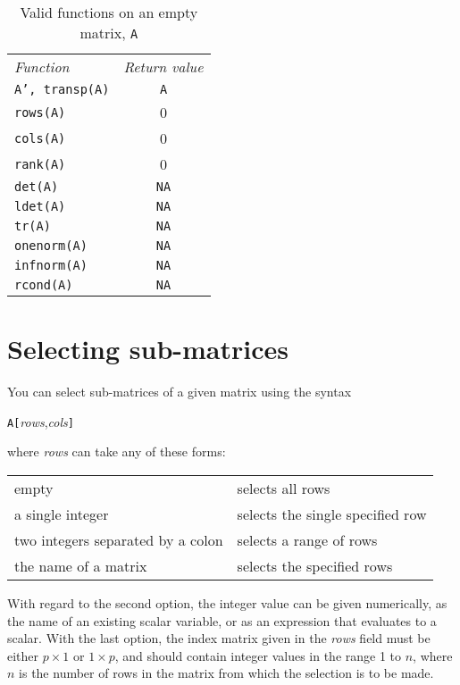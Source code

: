 \begin{table}[htbp]
\centering
\begin{tabular}{lc}
\textit{Function} & \textit{Return value} \\ [4pt]
  \texttt{A', transp(A)} & \texttt{A} \\
  \texttt{rows(A)} & 0 \\
  \texttt{cols(A)} & 0 \\
  \texttt{rank(A)} & 0 \\
  \texttt{det(A)} & \texttt{NA} \\
  \texttt{ldet(A)} & \texttt{NA} \\
  \texttt{tr(A)} & \texttt{NA} \\
  \texttt{onenorm(A)} & \texttt{NA} \\
  \texttt{infnorm(A)} & \texttt{NA} \\
  \texttt{rcond(A)} & \texttt{NA} \\
\end{tabular}
\caption{Valid functions on an empty matrix, \texttt{A}}
\label{tab:empty-matrix-funcs}
\end{table}


\section{Selecting sub-matrices}
\label{sec:matrix-sub}

You can select sub-matrices of a given matrix using the syntax

\texttt{A[}\textsl{rows},\textsl{cols}\texttt{]}

where \textsl{rows} can take any of these forms:

\begin{center}
\begin{tabular}{ll}
empty & selects all rows \\
a single integer & selects the single specified row \\
two integers separated by a colon & selects a range of rows \\
the name of a matrix & selects the specified rows \\
\end{tabular}
\end{center}

With regard to the second option, the integer value can be given
numerically, as the name of an existing scalar variable, or as an
expression that evaluates to a scalar.  With the last option, the
index matrix given in the \textsl{rows} field must be either $p\times
1$ or $1\times p$, and should contain integer values in the range 1 to
$n$, where $n$ is the number of rows in the matrix from which the
selection is to be made.

